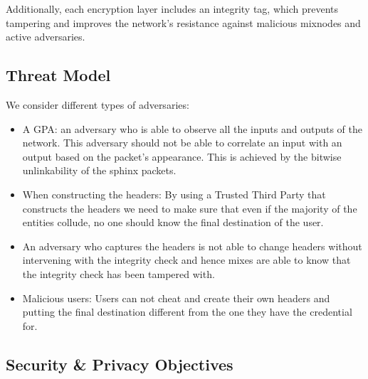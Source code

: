 Additionally, each encryption layer includes an integrity tag, which prevents tampering and improves the network’s resistance against malicious mixnodes and active adversaries.

\subsection{Threat Model} 

We consider different types of adversaries:
\begin{itemize}
	\item A GPA: an adversary who is able to observe all the inputs and outputs of the network. This adversary should not be able to correlate an input with an output based on the packet's appearance. This is achieved by the bitwise unlinkability of the sphinx packets.
	\item When constructing the headers: By using a Trusted Third Party that constructs the headers we need to make sure that even if the majority of the entities collude, no one should know the final destination of the user.
	\item An adversary who captures the headers is not able to change headers without intervening with the integrity check and hence mixes are able to know that the integrity check has been tampered with.
	\item Malicious users: Users can not cheat and create their own headers and putting the final destination different from the one they have the credential for.
\end{itemize}

\subsection{Security \& Privacy Objectives}
\label{sec:sp-objectives}

